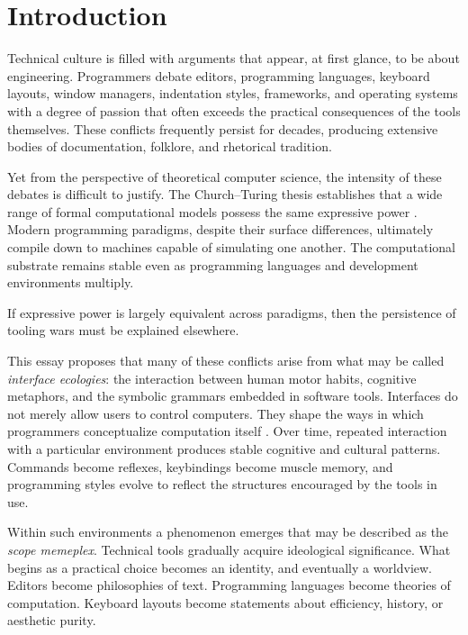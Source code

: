 \documentclass[11pt]{article}
\theoremstyle{definition}
\begin{document}
\newpage
\tableofcontents
\newpage

\section{Introduction}

Technical culture is filled with arguments that appear, at first glance,
to be about engineering. Programmers debate editors, programming
languages, keyboard layouts, window managers, indentation styles,
frameworks, and operating systems with a degree of passion that often
exceeds the practical consequences of the tools themselves. These
conflicts frequently persist for decades, producing extensive bodies of
documentation, folklore, and rhetorical tradition.

Yet from the perspective of theoretical computer science, the intensity
of these debates is difficult to justify. The Church--Turing thesis
establishes that a wide range of formal computational models possess the
same expressive power \cite{turing1936,kleene1952}. Modern programming
paradigms, despite their surface differences, ultimately compile down to
machines capable of simulating one another. The computational substrate
remains stable even as programming languages and development environments
multiply.

If expressive power is largely equivalent across paradigms, then the
persistence of tooling wars must be explained elsewhere.

This essay proposes that many of these conflicts arise from what may be
called \emph{interface ecologies}: the interaction between human motor
habits, cognitive metaphors, and the symbolic grammars embedded in
software tools. Interfaces do not merely allow users to control
computers. They shape the ways in which programmers conceptualize
computation itself \cite{norman1988}. Over time, repeated interaction
with a particular environment produces stable cognitive and cultural
patterns. Commands become reflexes, keybindings become muscle memory,
and programming styles evolve to reflect the structures encouraged by
the tools in use.

Within such environments a phenomenon emerges that may be described as
the \emph{scope memeplex}. Technical tools gradually acquire ideological
significance. What begins as a practical choice becomes an identity,
and eventually a worldview. Editors become philosophies of text.
Programming languages become theories of computation. Keyboard layouts
become statements about efficiency, history, or aesthetic purity.
\end{document}

